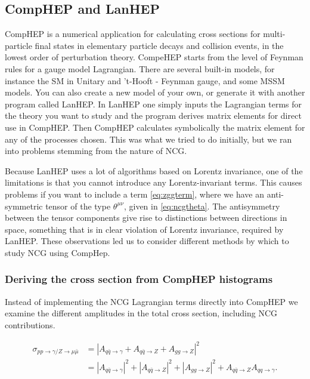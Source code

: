 \subsection{CompHEP and LanHEP}

CompHEP is a numerical application for calculating cross sections for multi-particle final states in elementary particle decays and collision events, in the lowest order of perturbation theory. CompeHEP starts from the level of Feynman rules for a gauge model Lagrangian. There are several built-in models, for instance the SM in Unitary and 't-Hooft - Feynman gauge, and some MSSM models. You can also create a new model of your own, or generate it with another program called LanHEP. In LanHEP one simply inputs the Lagrangian terms for the theory you want to study and the program derives matrix elements for direct use in CompHEP. Then CompHEP calculates symbolically the matrix element for any of the processes chosen. This was what we tried to do initially, but we ran into problems stemming from the nature of NCG.

Because LanHEP uses a lot of algorithms based on Lorentz invariance, one of the limitations is that you cannot introduce any Lorentz-invariant terms. This causes problems if you want to include a term \eqref{eq:zggterm}, where we have an anti-symmetric tensor of the type $\theta^{\mu\nu}$, given in \eqref{eq:ncgtheta}. The antisymmetry between the tensor components give rise to distinctions between directions in space, something that is in clear violation of Lorentz invariance, required by LanHEP. These observations led us to consider different methods by which to study NCG using CompHep.

\subsubsection{Deriving the cross section from CompHEP histograms}

Instead of implementing the NCG Lagrangian terms directly into CompHEP we examine the different amplitudes in the total cross section, including NCG contributions.

\begin{align}
\sigma_{pp \rightarrow \gamma/ Z \rightarrow \mu \bar \mu} &= |A_{q \bar q \rightarrow \gamma} + A_{q \bar q \rightarrow Z} + A_{gg \rightarrow Z}|^{2} \nonumber \\
&= |A_{q \bar q \rightarrow \gamma}|^{2} + |A_{q \bar q \rightarrow Z}|^ {2} + |A_{gg \rightarrow Z}|^{2} + A_{q \bar q \rightarrow Z }A_{qq \rightarrow \gamma}.
\end{align}

